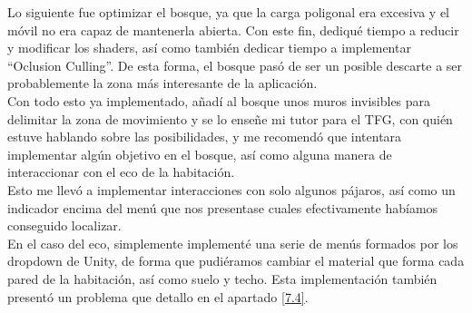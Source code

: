 \quad Lo siguiente fue optimizar el bosque, ya que la carga poligonal era excesiva y el móvil no era capaz de mantenerla abierta. Con este fin, dediqué tiempo a reducir y modificar los shaders, así como también dedicar tiempo a implementar “Oclusion Culling”. De esta forma, el bosque pasó de ser un posible descarte a ser probablemente la zona más interesante de la aplicación.\\

\quad Con todo esto ya implementado, añadí al bosque unos muros invisibles para delimitar la zona de movimiento y se lo enseñe mi tutor para el TFG, con quién estuve hablando sobre las posibilidades, y me recomendó que intentara implementar algún objetivo en el bosque, así como alguna manera de interaccionar con el eco de la habitación.\\

\quad Esto me llevó a implementar interacciones con solo algunos pájaros, así como un indicador encima del menú que nos presentase cuales efectivamente habíamos conseguido localizar.\\

\quad En el caso del eco, simplemente implementé una serie de menús formados por los dropdown de Unity, de forma que pudiéramos cambiar el material que forma cada pared de la habitación, así como suelo y techo. Esta implementación también presentó un problema que detallo en el apartado \eqref{7.4}.\\ 

\newpage

